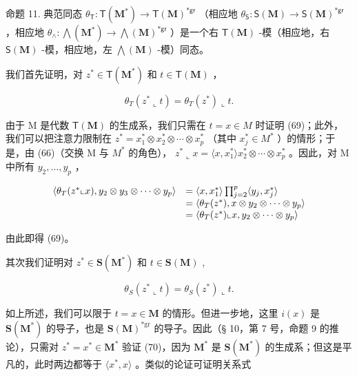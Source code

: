 命题 11. 典范同态 \(\theta_{\mathsf{T}}: \mathsf{T}(\mathbf{M}^{*}) \to \mathsf{T}(\mathbf{M})^{*\mathsf{gr}}\) （相应地 \(\theta_{\mathsf{S}}: \mathsf{S}(\mathbf{M}) \to \mathsf{S}(\mathbf{M})^{*\mathsf{gr}}\) ，相应地 \(\theta_{\wedge}: \bigwedge (\mathbf{M}^{*}) \to \bigwedge (\mathbf{M})^{*\mathsf{gr}}\) ）是一个右 \(\mathsf{T}(\mathbf{M})\) -模（相应地，右 \(\mathsf{S}(\mathbf{M})\) -模，相应地，左 \(\bigwedge (\mathbf{M})\) -模）同态。

我们首先证明，对 \(z^{*} \in \mathsf{T}(\mathbf{M}^{*})\) 和 \(t \in \mathsf{T}(\mathbf{M})\) ，

\[
\theta_ {T} (z ^ {*} \llcorner t) = \theta_ {T} (z ^ {*}) \llcorner t.\tag{69}
\]

由于 M 是代数 \(\mathsf{T}(\mathbf{M})\) 的生成系，我们只需在 \(t = x \in M\) 时证明 (69)；此外，我们可以把注意力限制在 \(z^{*} = x_{1}^{*} \otimes x_{2}^{*} \otimes \cdots \otimes x_{p}^{*}\) （其中 \(x_{j}^{*} \in M^{*}\) ）的情形；于是，由 (66)（交换 M 与 \(M^{*}\) 的角色）， \(z^{*} \llcorner x = \langle x, x_{1}^{*} \rangle x_{2}^{*} \otimes \cdots \otimes x_{p}^{*}\) 。因此，对 M 中所有 \(y_{2}, \ldots, y_{p}\) ，

\[
\begin{array}{r l} \langle \theta_ {T} (z ^ {*} \llcorner x), y _ {2} \otimes y _ {3} \otimes \dots \otimes y _ {p} \rangle & = \langle x, x _ {1} ^ {*} \rangle \prod_ {j = 2} ^ {p} \langle y _ {j}, x _ {j} ^ {*} \rangle \\ & = \langle \theta_ {T} (z ^ {*}), x \otimes y _ {2} \otimes \dots \otimes y _ {p} \rangle \\ & = \langle \theta_ {T} (z ^ {*}) \llcorner x, y _ {2} \otimes \dots \otimes y _ {p} \rangle \end{array}
\]

由此即得 (69)。

其次我们证明对 \(z^{*} \in \mathbf{S}(\mathbf{M}^{*})\) 和 \(t \in \mathbf{S}(\mathbf{M})\) ,

\[
\theta_ {S} (z ^ {*} \llcorner t) = \theta_ {S} (z ^ {*}) \llcorner t.\tag{70}
\]

如上所述，我们可以限于 \(t = x \in \mathbf{M}\) 的情形。但进一步地，这里 \(i(x)\) 是 \(\mathbf{S}(\mathbf{M}^*)\) 的导子，也是 \(\mathbf{S}(\mathbf{M})^{*\text{gr}}\) 的导子。因此（§ 10，第 7 号，命题 9 的推论），只需对 \(z^* = x^* \in \mathbf{M}^*\) 验证 (70)，因为 \(\mathbf{M}^*\) 是 \(\mathbf{S}(\mathbf{M}^*)\) 的生成系；但这是平凡的，此时两边都等于 \(\langle x^*, x \rangle\) 。类似的论证可证明关系式

